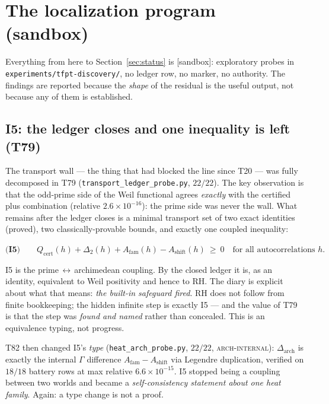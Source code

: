 \documentclass[11pt,a4paper]{article}
\newcommand{\Qcert}{Q_{\mathrm{cert}}}
\newcommand{\Afam}{A_{\mathrm{fam}}}
\newcommand{\Ashift}{A_{\mathrm{shift}}}
\newcommand{\Darch}{\Delta_{\mathrm{arch}}}
\newcommand{\sbx}{{\small\textcolor{tfgray}{\textsf{[sandbox]}}}}
\begin{document}
\section{The localization program (sandbox)}\label{sec:i5}
\begin{gapboxnb}[Provenance]
Everything from here to Section~\ref{sec:status} is \sbx: exploratory probes in
\texttt{experiments/tfpt-discovery/}, no ledger row, no marker, no authority. The findings are
reported because the \emph{shape} of the residual is the useful output, not because any of them is
established.
\end{gapboxnb}

\subsection{I5: the ledger closes and one inequality is left (T79)}
The transport wall --- the thing that had blocked the line since T20 --- was fully decomposed in T79
(\texttt{transport\_ledger\_probe.py}, $22/22$). The key observation is that the odd-prime side of the
Weil functional agrees \emph{exactly} with the certified plus combination (relative $2.6\times10^{-16}$):
the prime side was never the wall. What remains after the ledger closes is a minimal transport set of
two exact identities (proved), two classically-provable bounds, and exactly one coupled inequality:

\begin{keyeq}$\displaystyle
\textbf{(I5)}\qquad \Qcert(h)+\Delta_2(h)+\Afam(h)-\Ashift(h)\ \ge\ 0
\quad\text{for all autocorrelations }h.$\end{keyeq}

\noindent I5 is the prime\,$\leftrightarrow$\,archimedean coupling. By the closed ledger it is, as an
identity, equivalent to Weil positivity and hence to RH. The diary is explicit about what that means:
\emph{the built-in safeguard fired}. RH does not follow from finite bookkeeping; the hidden infinite
step is exactly I5 --- and the value of T79 is that the step was \emph{found and named} rather than
concealed. This is an equivalence typing, not progress.

T82 then changed I5's \emph{type} (\texttt{heat\_arch\_probe.py}, $22/22$, \textsc{arch-internal}):
$\Darch$ is exactly the internal $\Gamma$ difference $\Afam-\Ashift$ via Legendre duplication, verified
on $18/18$ battery rows at max relative $6.6\times10^{-15}$. I5 stopped being a coupling between two
worlds and became a \emph{self-consistency statement about one heat family}. Again: a type change is
not a proof.
\end{document}

